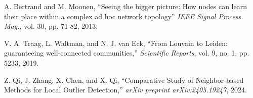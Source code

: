 \documentclass[12pt,twoside,a4paper,fleqn,bibliography=totocnumbered]{report}
\begin{document}

\setcounter{page}{1}
\cleardoublepage

\tableofcontents
\cleardoublepage
{}
\setcounter{page}{1}








\cleardoublepage
{}
%
%    	             

\begin{thebibliography}{1}

 A. Bertrand and M. Moonen, ``Seeing the bigger picture: How nodes can learn their place within a complex ad hoc network topology'' \emph{IEEE Signal Process. Mag.}, vol. 30, pp. 71-82, 2013.

 V. A. Traag, L. Waltman, and N. J. van Eck, ``From Louvain to Leiden: guaranteeing well-connected communities,'' \emph{Scientific Reports}, vol. 9, no. 1, pp. 5233, 2019.

 Z. Qi, J. Zhang, X. Chen, and X. Qi, ``Comparative Study of Neighbor-based Methods for Local Outlier Detection,'' \emph{arXiv preprint arXiv:2405.19247}, 2024.

\end{thebibliography}
\end{document}
